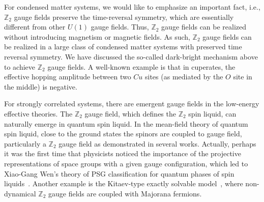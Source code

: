 \documentclass[aps,prl,twocolumn,noshowpacs,superscriptaddress]{revtex4-1}
\def \Z {\mathbb{Z}}
\begin{document}
For condensed matter systems, we would like to emphasize an important fact, i.e., $ \Z_2 $ gauge fields preserve the time-reversal symmetry, which are essentially different from other $ U(1) $ gauge fields. Thus, $ \Z_2 $ gauge fields can be realized without introducing magnetism or magnetic fields. As such, $ \Z_2 $ gauge fields can be realized in a large class of condensed matter systems with preserved time reversal symmetry. We have discussed the so-called dark-bright mechanism above to achieve $ \Z_2 $ gauge fields. A well-known example is that in cuperates, the effective hopping amplitude between two $Cu$ sites (as mediated by the $O$ site in the middle) is negative.

For strongly correlated systems, there are emergent gauge fields in the low-energy effective theories. The $ \Z_2 $ gauge field, which defines the $ \Z_2 $ spin liquid, can naturally emerge in quantum spin liquid. In the mean-field theory of quantum spin liquid, close to the ground states the spinors are coupled to gauge field, particularly a $ \Z_2 $ gauge field as demonstrated in several works. Actually, perhaps it was the first time that physicists noticed the importance of the projective representations of space groups with a given gauge configuration, which led to Xiao-Gang Wen's theory of PSG classification for quantum phases of spin liquids~\cite{Wen-PSG}. Another example is the Kitaev-type exactly solvable model~\cite{Kitaev2006}, where non-dynamical $ \Z_2 $ gauge fields are coupled with Majorana fermions.







%
%

\end{document}
